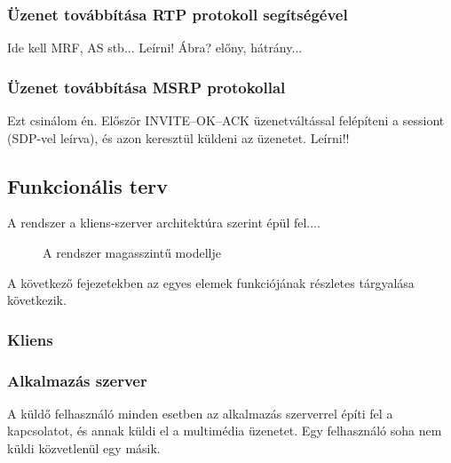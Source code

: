 \subsubsection{Üzenet továbbítása RTP protokoll segítségével}
Ide kell MRF, AS stb... Leírni! Ábra? előny, hátrány...

\subsubsection{Üzenet továbbítása MSRP protokollal}
Ezt csinálom én. Először INVITE--OK--ACK üzenetváltással felépíteni a sessiont (SDP-vel leírva), és azon keresztül küldeni az üzenetet. Leírni!!

\subsection{Funkcionális terv}

A rendszer a kliens-szerver architektúra szerint épül fel....

\begin{figure}[htbp]
\center
{}
\caption{A rendszer magasszintű modellje}
\label{fig:model}
\end{figure}

A következő fejezetekben az egyes elemek funkciójának részletes tárgyalása következik.

\subsubsection{Kliens}
\label{sec:kliens_pc}


\subsubsection{Alkalmazás szerver}
A küldő felhasználó minden esetben az alkalmazás szerverrel építi fel a kapcsolatot, és annak küldi el a multimédia üzenetet. Egy felhasználó soha nem küldi közvetlenül egy másik.

